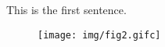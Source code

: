 \documentclass[12pt,a4paper]{article}
\begin{document}
This is the first sentence.
\begin{figure}
\texttt{[image: img/fig2.gifc]}
\end{figure}
\end{document}
